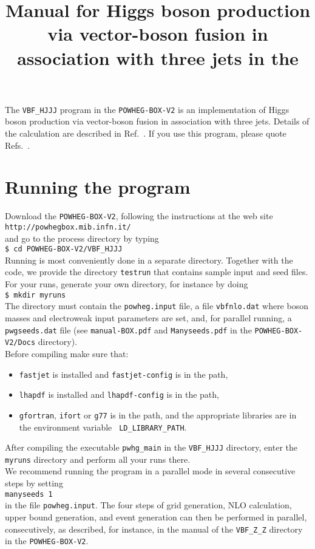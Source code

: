 \documentclass[a4paper,11pt]{article}
\title{Manual for  Higgs boson production via vector-boson fusion in association with three jets in the \POWHEGBOXV{}}
\date{}
\newcommand\POWHEGBOXV{{\tt POWHEG-BOX-V2}}
\begin{document}
\maketitle
%
\noindent
The {\tt VBF\_HJJJ} program in the \POWHEGBOXV{} is an implementation of Higgs boson production via vector-boson fusion in association with three jets. Details of the calculation are described in Ref.~\cite{JSZ}. If you use this program, please quote Refs.~\cite{JSZ,Figy:2007kv,Arnold:2008rz,Alioli:2010xd}.
%
\section*{Running the program}
%
Download the \POWHEGBOXV{}, following the instructions at the web site 
\\[2ex]
{\tt http://powhegbox.mib.infn.it/}
\\[2ex] 
and go to the process directory by typing 
\\[2ex]
{\tt \$ cd \POWHEGBOXV/VBF\_HJJJ}  
\\[2ex]
Running is most conveniently done in a separate directory. Together with the code, we provide the directory {\tt testrun} that contains sample input and seed files. 
\\[2ex]
For your runs, generate your own directory, for instance by doing 
\\[2ex]
{\tt \$ mkdir myruns}
\\[2ex]
The directory must contain the {\tt powheg.input} file, a file {\tt vbfnlo.dat} where boson masses and electroweak input parameters are set, and, for
parallel running, a {\tt pwgseeds.dat} file (see {\tt manual-BOX.pdf}
and {\tt Manyseeds.pdf} in the  {\tt POWHEG-BOX-V2/Docs} directory).
\\[2ex]
Before compiling make sure that:
\begin{itemize}
\item 
{\tt fastjet} is installed and {\tt fastjet-config} is in the path,
\item 
{\tt lhapdf} is installed and {\tt lhapdf-config} is in the path,
\item
{\tt gfortran}, {\tt ifort} or {\tt g77} is in the path, and the
appropriate libraries are in the environment variable {\tt
  LD\_LIBRARY\_PATH}. 
\end{itemize}
After compiling the executable {\tt pwhg\_main} in the {\tt VBF\_HJJJ} directory, enter the {\tt myruns} directory and perform all your runs there. 
\\[2ex]
We recommend running the program in a parallel mode in several consecutive steps by setting 
\\[2ex]
{\tt manyseeds   1}
\\[2ex]
in the file  {\tt powheg.input}. The four steps of grid generation, NLO calculation, upper bound generation, and event generation can then be performed in parallel, consecutively, as described, for instance, in the manual of the {\tt VBF\_Z\_Z} directory in the \POWHEGBOXV{}. 
\end{document}
